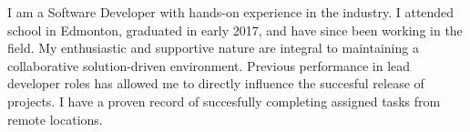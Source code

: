 I am a Software Developer with hands-on experience in the industry.  I attended school in Edmonton, graduated in early 2017, and have since been working in the field.  My enthusiastic and supportive nature are integral to maintaining a collaborative solution-driven environment. Previous performance in lead developer roles has allowed me to directly influence the succesful release of projects.  I have a proven record of succesfully completing assigned tasks from remote locations.